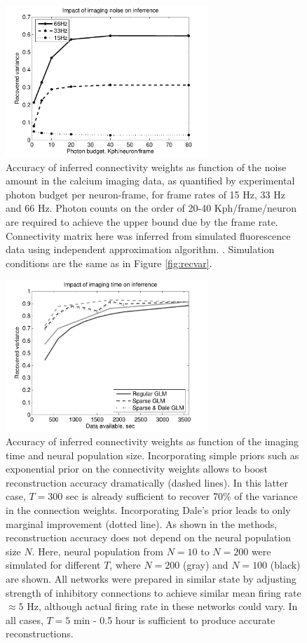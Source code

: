 \begin{figure}[h]
\centering
\includegraphics[width=3in]{../figs/FigureA6_recvar_SNR}
\caption{Accuracy of inferred connectivity weights as function of the noise amount in the calcium imaging data, as quantified by experimental photon budget per neuron-frame, for frame rates of 15 Hz, 33 Hz and 66 Hz. Photon counts on the order of 20-40 Kph/frame/neuron are required to achieve the upper bound due by the frame rate. Connectivity matrix here was inferred from simulated fluorescence data using independent approximation algorithm. . Simulation conditions are the same as in Figure \ref{fig:recvar}.}
\label{fig:recvar-SNR}
\end{figure}

\begin{figure}[h]
\centering
\includegraphics[width=3in]{../figs/FigureA7_recvar_NT}
\caption{Accuracy of inferred connectivity weights as function of the imaging time and neural population size.
Incorporating simple priors such as exponential prior on the connectivity weights allows to boost reconstruction accuracy dramatically (dashed lines). In this latter case, $T=300$ sec is already sufficient to recover 70\% of the variance in the connection weights. Incorporating Dale's prior leads to only marginal improvement (dotted line). As shown in the methods, reconstruction accuracy does not depend on the neural population size $N$.
Here, neural population from $N=10$ to $N=200$ were simulated for different $T$, where
$N=200$ (gray) and $N=100$ (black) are shown. All networks were prepared in similar state by adjusting strength of inhibitory connections to achieve similar mean firing rate $\approx 5$ Hz, although actual firing rate in these networks could vary.
In all cases, $T=5$ min - 0.5 hour is sufficient to produce accurate reconstructions.
}
\label{fig:recvar-NT}
\end{figure}


